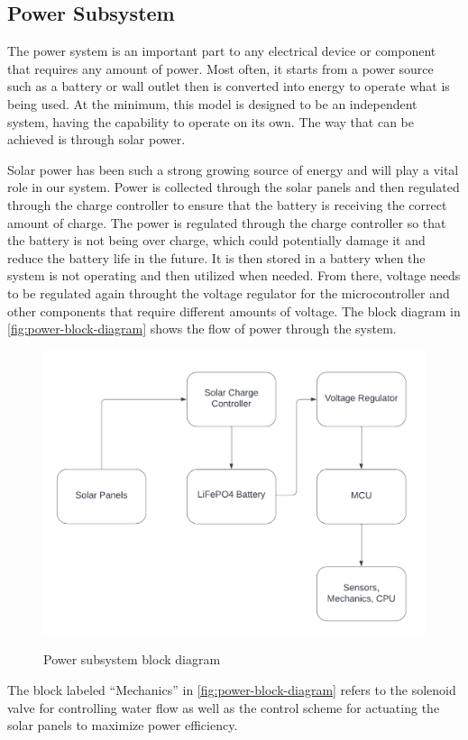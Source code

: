 \subsection{Power Subsystem}
\label{sec:power_subsystem}
The power system is an important part to any electrical device or component that requires any amount of power. Most often, it starts from a power source such as a battery or wall outlet then is converted into energy to operate what is being used. At the minimum, this model is designed to be an independent system, having the capability to operate on its own. The way that can be achieved is through solar power. \par
Solar power has been such a strong growing source of energy and will play a vital role in our system. Power is collected through the solar panels and then regulated through the charge controller to ensure that the battery is receiving the correct amount of charge. The power is regulated through the charge controller so that the battery is not being over charge, which could potentially damage it and reduce the battery life in the future. It is then stored in a battery when the system is not operating and then utilized when needed. From there, voltage needs to be regulated again throught the voltage regulator for the microcontroller and other components that require different amounts of voltage. The block diagram in \autoref{fig:power-block-diagram} shows the flow of power through the system. 

\begin{figure}[H]
    \centering
    \caption{Power subsystem block diagram}
    \includegraphics[width=\textwidth]{images/Power_System_Flowchart.png}
    \label{fig:power-block-diagram}
\end{figure}
The block labeled ``Mechanics'' in \autoref{fig:power-block-diagram} refers to the solenoid valve for controlling water flow as well as the control scheme for actuating the solar panels to maximize power efficiency.

